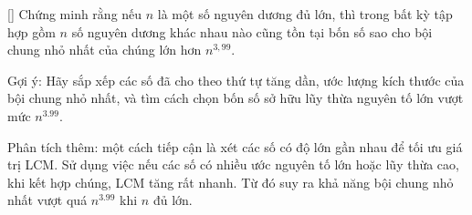 \documentclass[../01-divisibility.tex]{subfiles}
\begin{document}
\begin{exercise*}\label{example:HUN-2015-TST-KMA-633}[\textbf{}]
    Chứng minh rằng nếu \( n \) là một số nguyên dương đủ lớn,
    thì trong bất kỳ tập hợp gồm \( n \) số nguyên dương khác nhau nào cũng tồn tại bốn số sao cho bội chung nhỏ nhất của chúng lớn hơn \( n^{3{,}99} \).

    \begin{remark*}
        Gợi ý: Hãy sắp xếp các số đã cho theo thứ tự tăng dần, ước lượng kích thước của bội chung nhỏ nhất,
        và tìm cách chọn bốn số sở hữu lũy thừa nguyên tố lớn vượt mức \(n^{3.99}\).
    \end{remark*}

    \begin{story*}
        Phân tích thêm: một cách tiếp cận là xét các số có độ lớn gần nhau để tối ưu giá trị LCM.
        Sử dụng việc nếu các số có nhiều ước nguyên tố lớn hoặc lũy thừa cao, khi kết hợp chúng, LCM tăng rất nhanh.
        Từ đó suy ra khả năng bội chung nhỏ nhất vượt quá \(n^{3.99}\) khi \(n\) đủ lớn.
    \end{story*}
\end{exercise*}
\end{document}
